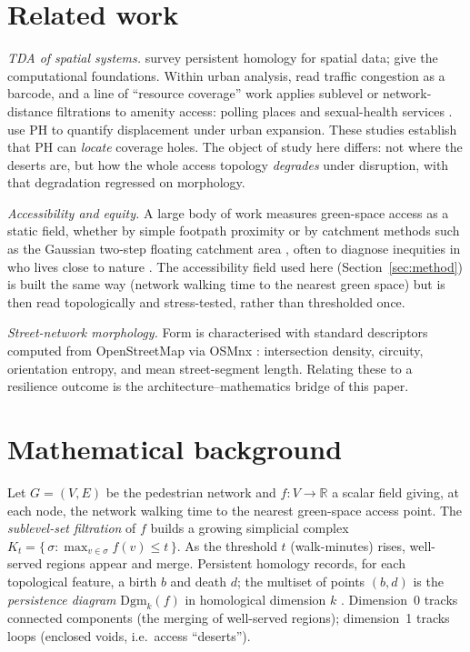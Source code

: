 \documentclass[sn-mathphys-num,pdflatex]{sn-jnl}
\begin{document}
\section{Related work}
\emph{TDA of spatial systems.} \citet{feng2021tda} survey persistent homology for
spatial data; \citet{otter2017roadmap} give the computational foundations. Within
urban analysis, \citet{wu2017congestion} read traffic congestion as a barcode,
and a line of ``resource coverage'' work applies sublevel or network-distance
filtrations to amenity access: polling places \citep{hickok2022polling} and
sexual-health services \citep{gonzalez2025healthcare}. \citet{rodriguez2025displacement}
use PH to quantify displacement under urban expansion. These studies establish
that PH can \emph{locate} coverage holes. The object of study here differs: not
where the deserts are, but how the whole access topology \emph{degrades} under
disruption, with that degradation regressed on morphology.

\emph{Accessibility and equity.} A large body of work measures green-space access
as a static field, whether by simple footpath proximity \citep{carthy2020greenspace}
or by catchment methods such as the Gaussian two-step floating catchment area
\citep{sun2023catchment}, often to diagnose inequities in who lives close to nature
\citep{asibey2026equity}. The accessibility field used here (Section~\ref{sec:method})
is built the same way (network walking time to the nearest green space) but is then
read topologically and stress-tested, rather than thresholded once.

\emph{Street-network morphology.} Form is characterised with standard descriptors
computed from OpenStreetMap via OSMnx \citep{boeing2017osmnx}: intersection
density, circuity, orientation entropy, and mean street-segment length. Relating
these to a resilience outcome is the architecture--mathematics bridge of this
paper.

\section{Mathematical background}
Let $G=(V,E)$ be the pedestrian network and $f:V\to\mathbb{R}$ a scalar field
giving, at each node, the network walking time to the nearest green-space access
point. The \emph{sublevel-set filtration} of $f$ builds a growing simplicial
complex $K_t = \{\,\sigma : \max_{v\in\sigma} f(v)\le t\,\}$. As the threshold
$t$ (walk-minutes) rises, well-served regions appear and merge. Persistent
homology records, for each topological feature, a birth $b$ and death $d$; the
multiset of points $(b,d)$ is the \emph{persistence diagram} $\mathrm{Dgm}_k(f)$
in homological dimension $k$ \citep{edelsbrunner2000persistence}. Dimension~0
tracks connected components (the merging of well-served regions); dimension~1
tracks loops (enclosed voids, i.e.\ access ``deserts'').
\end{document}
